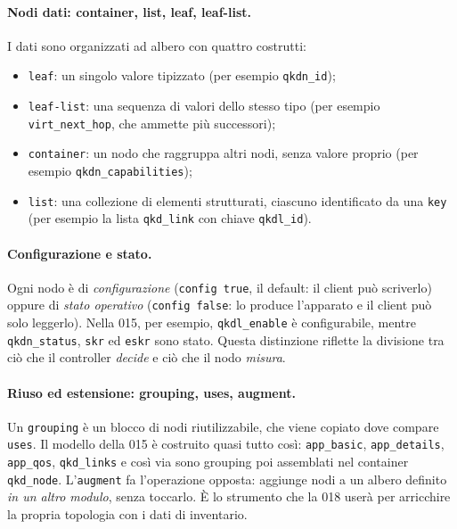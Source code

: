 \paragraph{Nodi dati: container, list, leaf, leaf-list.}
I dati sono organizzati ad albero con quattro costrutti:
\begin{itemize}
  \item \texttt{leaf}: un singolo valore tipizzato (per esempio
        \texttt{qkdn\_id});
  \item \texttt{leaf-list}: una sequenza di valori dello stesso tipo
        (per esempio \texttt{virt\_next\_hop}, che ammette più successori);
  \item \texttt{container}: un nodo che raggruppa altri nodi, senza
        valore proprio (per esempio \texttt{qkdn\_capabilities});
  \item \texttt{list}: una collezione di elementi strutturati, ciascuno
        identificato da una \texttt{key} (per esempio la lista
        \texttt{qkd\_link} con chiave \texttt{qkdl\_id}).
\end{itemize}

\paragraph{Configurazione e stato.}
Ogni nodo è di \emph{configurazione} (\texttt{config true}, il default:
il client può scriverlo) oppure di \emph{stato operativo}
(\texttt{config false}: lo produce l'apparato e il client può solo
leggerlo). Nella 015, per esempio, \texttt{qkdl\_enable} è configurabile,
mentre \texttt{qkdn\_status}, \texttt{skr} ed \texttt{eskr} sono stato.
Questa distinzione riflette la divisione tra ciò che il controller
\emph{decide} e ciò che il nodo \emph{misura}.

\paragraph{Riuso ed estensione: grouping, uses, augment.}
Un \texttt{grouping} è un blocco di nodi riutilizzabile, che viene
copiato dove compare \texttt{uses}. Il modello della 015 è costruito quasi
tutto così: \texttt{app\_basic}, \texttt{app\_details}, \texttt{app\_qos},
\texttt{qkd\_links} e così via sono grouping poi assemblati nel container
\texttt{qkd\_node}. L'\texttt{augment} fa l'operazione opposta: aggiunge
nodi a un albero definito \emph{in un altro modulo}, senza toccarlo. È lo
strumento che la 018 userà per arricchire la propria topologia con i dati
di inventario.

